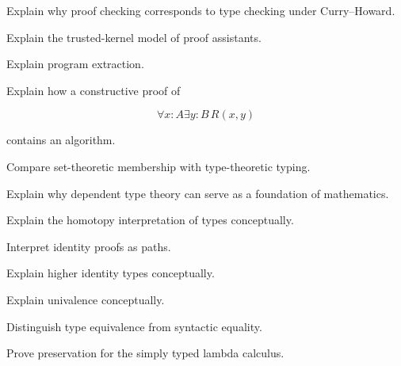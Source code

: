 \begin{exercise}[3]
Explain why proof checking corresponds to type checking under
Curry--Howard.
\end{exercise}

\begin{exercise}[3]
Explain the trusted-kernel model of proof assistants.
\end{exercise}

\begin{exercise}[3]
Explain program extraction.
\end{exercise}

\begin{exercise}[3]
Explain how a constructive proof of

\[
\forall x:A\exists y:B\,R(x,y)
\]

contains an algorithm.
\end{exercise}

\begin{exercise}[3]
Compare set-theoretic membership with type-theoretic typing.
\end{exercise}

\begin{exercise}[3]
Explain why dependent type theory can serve as a foundation of mathematics.
\end{exercise}

\begin{exercise}[3]
Explain the homotopy interpretation of types conceptually.
\end{exercise}

\begin{exercise}[3]
Interpret identity proofs as paths.
\end{exercise}

\begin{exercise}[3]
Explain higher identity types conceptually.
\end{exercise}

\begin{exercise}[3]
Explain univalence conceptually.
\end{exercise}

\begin{exercise}[3]
Distinguish type equivalence from syntactic equality.
\end{exercise}

\begin{exercise}[4]
Prove preservation for the simply typed lambda calculus.
\end{exercise}

